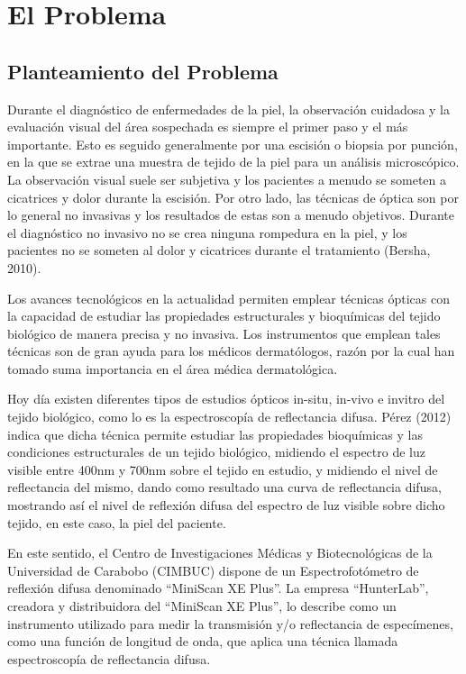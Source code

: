 \chapter{\label{cap:1}El Problema}

	\section{Planteamiento del Problema}	
Durante el diagn\'{o}stico de enfermedades de la piel, la observaci\'{o}n cuidadosa y la evaluaci\'{o}n visual del \'{a}rea sospechada es siempre el primer paso y el m\'{a}s importante. Esto es seguido generalmente por una escisi\'{o}n
o biopsia por punci\'{o}n, en la que se extrae una muestra de tejido de la piel para un an\'{a}lisis microsc\'{o}pico. La observaci\'{o}n visual suele ser subjetiva y los pacientes a menudo se someten a cicatrices y dolor durante la escisi\'{o}n. Por otro lado, las t\'{e}cnicas de \'{o}ptica son por lo general no invasivas y los resultados de estas son a menudo objetivos. Durante el diagn\'{o}stico no invasivo no se crea ninguna rompedura en la piel, y los pacientes no se someten al dolor y cicatrices durante el tratamiento (Bersha, 2010).

Los avances tecnol\'{o}gicos en la actualidad permiten emplear t\'{e}cnicas \'{o}pticas con la capacidad de estudiar  las propiedades estructurales y bioqu\'{i}micas del tejido biol\'{o}gico de manera precisa y no invasiva. Los instrumentos que emplean tales t\'{e}cnicas son de gran ayuda para los m\'{e}dicos dermat\'{o}logos, raz\'{o}n por la cual han tomado suma importancia en el \'{a}rea m\'{e}dica dermatol\'{o}gica.

Hoy d\'{i}a existen diferentes tipos de estudios \'{o}pticos in-situ, in-vivo e invitro del tejido biol\'{o}gico, como lo es la espectroscop\'{i}a de reflectancia difusa. P\'{e}rez (2012) indica que dicha t\'{e}cnica permite estudiar las propiedades bioqu\'{i}micas y las condiciones estructurales de un tejido biol\'{o}gico, midiendo el espectro de luz visible entre 400nm y 700nm sobre el tejido en estudio, y midiendo el nivel de reflectancia del mismo, dando como resultado una curva de reflectancia difusa, mostrando as\'{i} el nivel de reflexi\'{o}n difusa del espectro de luz visible sobre dicho tejido, en este caso, la piel del paciente.

En este sentido, el Centro de Investigaciones M\'{e}dicas y Biotecnol\'{o}gicas de la Universidad de Carabobo (CIMBUC) dispone de un Espectrofot\'{o}metro de reflexi\'{o}n difusa denominado ``MiniScan XE Plus''. La empresa ``HunterLab'', creadora y distribuidora del ``MiniScan XE Plus'', lo describe como un instrumento utilizado para medir la transmisi\'{o}n y/o reflectancia de espec\'{i}menes, como una funci\'{o}n de longitud de onda, que aplica una t\'{e}cnica llamada espectroscop\'{i}a de reflectancia difusa. 

